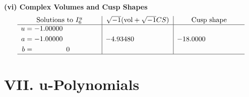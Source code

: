\documentclass[1p]{elsarticle_modified}
\theoremstyle{definition}
\newcommand{\I}{\sqrt{-1}}
\begin{document}
\newpage\flushleft \textbf{(vi) Complex Volumes and Cusp Shapes}
$$\begin{array}{c|c|c}  
\text{Solutions to }I^u_{6}& \I (\text{vol} + \sqrt{-1}CS) & \text{Cusp shape}\\
 \hline 
\begin{aligned}
u &= -1.00000\phantom{ +0.000000I} \\
a &= -1.00000\phantom{ +0.000000I} \\
b &= \phantom{-0.000000 } 0\end{aligned}
 & -4.93480\phantom{ +0.000000I} & -18.0000\phantom{ +0.000000I}\\
 \hline 
 \end{array}$$\newpage
\newpage\renewcommand{\arraystretch}{1}
\centering \section*{ VII. u-Polynomials}
\end{document}
